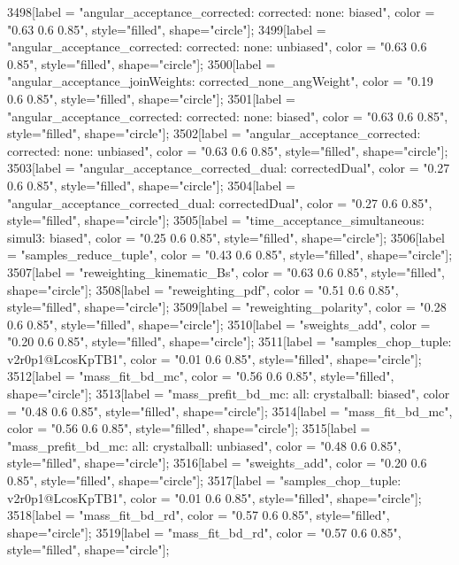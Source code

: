 {	3498[label = "angular_acceptance_corrected\nangacc: corrected\ncsp: none\ntrigger: biased", color = "0.63 0.6 0.85", style="filled", shape="circle"];
	3499[label = "angular_acceptance_corrected\nangacc: corrected\ncsp: none\ntrigger: unbiased", color = "0.63 0.6 0.85", style="filled", shape="circle"];
	3500[label = "angular_acceptance_joinWeights\nwflag: corrected_none_angWeight", color = "0.19 0.6 0.85", style="filled", shape="circle"];
	3501[label = "angular_acceptance_corrected\nangacc: corrected\ncsp: none\ntrigger: biased", color = "0.63 0.6 0.85", style="filled", shape="circle"];
	3502[label = "angular_acceptance_corrected\nangacc: corrected\ncsp: none\ntrigger: unbiased", color = "0.63 0.6 0.85", style="filled", shape="circle"];
	3503[label = "angular_acceptance_corrected_dual\nstep: correctedDual", color = "0.27 0.6 0.85", style="filled", shape="circle"];
	3504[label = "angular_acceptance_corrected_dual\nstep: correctedDual", color = "0.27 0.6 0.85", style="filled", shape="circle"];
	3505[label = "time_acceptance_simultaneous\ntimeacc: simul3\ntrigger: biased", color = "0.25 0.6 0.85", style="filled", shape="circle"];
	3506[label = "samples_reduce_tuple", color = "0.43 0.6 0.85", style="filled", shape="circle"];
	3507[label = "reweighting_kinematic_Bs", color = "0.63 0.6 0.85", style="filled", shape="circle"];
	3508[label = "reweighting_pdf", color = "0.51 0.6 0.85", style="filled", shape="circle"];
	3509[label = "reweighting_polarity", color = "0.28 0.6 0.85", style="filled", shape="circle"];
	3510[label = "sweights_add", color = "0.20 0.6 0.85", style="filled", shape="circle"];
	3511[label = "samples_chop_tuple\nversion: v2r0p1@LcosKpTB1", color = "0.01 0.6 0.85", style="filled", shape="circle"];
	3512[label = "mass_fit_bd_mc", color = "0.56 0.6 0.85", style="filled", shape="circle"];
	3513[label = "mass_prefit_bd_mc\nmassbin: all\nmassmodel: crystalball\ntrigger: biased", color = "0.48 0.6 0.85", style="filled", shape="circle"];
	3514[label = "mass_fit_bd_mc", color = "0.56 0.6 0.85", style="filled", shape="circle"];
	3515[label = "mass_prefit_bd_mc\nmassbin: all\nmassmodel: crystalball\ntrigger: unbiased", color = "0.48 0.6 0.85", style="filled", shape="circle"];
	3516[label = "sweights_add", color = "0.20 0.6 0.85", style="filled", shape="circle"];
	3517[label = "samples_chop_tuple\nversion: v2r0p1@LcosKpTB1", color = "0.01 0.6 0.85", style="filled", shape="circle"];
	3518[label = "mass_fit_bd_rd", color = "0.57 0.6 0.85", style="filled", shape="circle"];
	3519[label = "mass_fit_bd_rd", color = "0.57 0.6 0.85", style="filled", shape="circle"];
}
